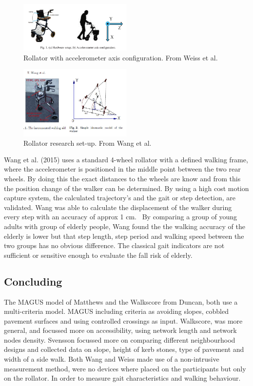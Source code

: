 \begin{figure}[h]
\includegraphics[width=0.5\textwidth]{img/B_Weiss.png}
\centering
\caption[Rollator with accelerometer axis configuration]{Rollator with accelerometer axis configuration. From Weiss et al.~\cite{Weiss2014} \label{rolaxis}}
\end{figure}
\begin{figure}[h]
\includegraphics[width=0.5\textwidth]{img/B_Wang.jpg}
\centering
\caption[Rollator set-up]{Rollator research set-up. From Wang et al.~\cite{Wang2015} \label{rolsetup}}
\end{figure}

Wang et al. (2015) uses a standard 4-wheel rollator with a defined walking frame, where the accelerometer is positioned in the middle point between the two rear wheels. By doing this the exact distances to the wheels are know and from this the position change of the walker can be determined. By using a high cost motion capture system, the calculated trajectory's and the gait or step detection, are validated. Wang was able to calculate the displacement of the walker during every step with an accuracy of approx 1 cm.~\cite{Wang2015} By comparing a group of young adults with group of elderly people, Wang found the the walking accuracy of the elderly is lower but that step length, step period and walking speed between the two groups has no obvious difference. The classical gait indicators are not sufficient or sensitive enough to evaluate the fall risk of elderly.~\cite{Wang2015}

\subsection{Concluding}
The MAGUS model of Matthews and the Walkscore from Duncan, both use a multi-criteria model. MAGUS including criteria as avoiding slopes, cobbled pavement surfaces and using controlled crossings as input. Walkscore, was more general, and focussed more on accessibility, using network length and network nodes density. Svensson focussed more on comparing different neighbourhood designs and collected data on slope, height of kerb stones, type of pavement and width of a side walk. Both Wang and Weiss made use of a non-intrusive measurement method, were no devices where placed on the participants but only on the rollator. In order to measure gait characteristics and walking behaviour. 


